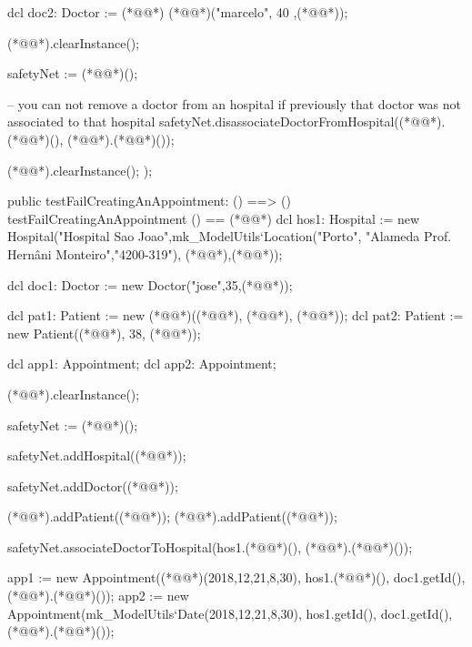 \begin{vdmpp}[breaklines=true]
    dcl doc2: Doctor := (*@@*) (*@@*)("marcelo", 40 ,(*@@*));
    
    (*@@*).clearInstance();
    
    safetyNet := (*@@*)();
   
    -- you can not remove a doctor from an hospital if previously that doctor was not associated to that hospital
    safetyNet.disassociateDoctorFromHospital((*@@*).(*@@*)(), (*@@*).(*@@*)());
   
    (*@@*).clearInstance();
   );
 
 
 public testFailCreatingAnAppointment: () ==> ()
  testFailCreatingAnAppointment () == (*@\vdmnotcovered{(}@*)
   dcl hos1: Hospital := new Hospital("Hospital Sao Joao",mk_ModelUtils`Location("Porto", "Alameda Prof. Hernâni Monteiro","4200-319"), {(*@@*),(*@@*)});
  
  dcl doc1: Doctor := new Doctor("jose",35,(*@@*));
  
  dcl pat1: Patient := new (*@@*)((*@@*), (*@@*), (*@@*));
  dcl pat2: Patient := new Patient((*@@*), 38, (*@@*));
  
  dcl app1: Appointment;
  dcl app2: Appointment;
  
   (*@@*).clearInstance();
    
   safetyNet := (*@@*)();
   
   safetyNet.addHospital((*@@*));
    
  safetyNet.addDoctor((*@@*));
  
  (*@@*).addPatient((*@@*));
  (*@@*).addPatient((*@@*));

  safetyNet.associateDoctorToHospital(hos1.(*@@*)(), (*@@*).(*@@*)());

  app1 := new Appointment((*@@*)(2018,12,21,8,30), hos1.(*@@*)(), doc1.getId(), (*@@*).(*@@*)());
  app2 := new Appointment(mk_ModelUtils`Date(2018,12,21,8,30), hos1.getId(), doc1.getId(), (*@@*).(*@@*)());


\end{vdmpp}
